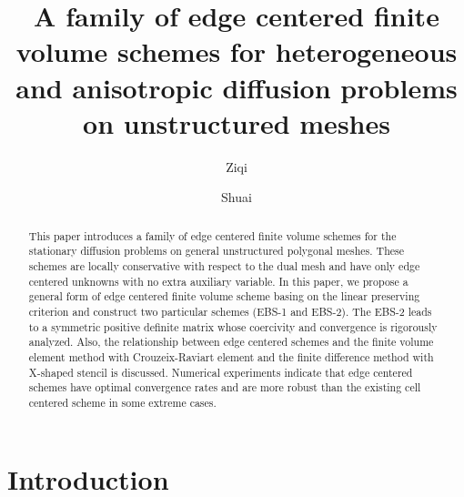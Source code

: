 \documentclass[times,review,preprint,authoryear]{elsarticle}
\begin{document}

\begin{frontmatter}

\title{A family of edge centered finite volume schemes for heterogeneous and anisotropic diffusion problems on unstructured meshes}

\author[1]{Ziqi }

\author[2]{Shuai }

\address[1]{Department of Mathematical Sciences, Tsinghua University, Beijing 100084, PR China}
\address[2]{Graduate School of China Academy of Engineering Physics,  Beijing, 100088, PR China}

\received{***}
\finalform{***}
\accepted{***}
\availableonline{***}
\communicated{***}

\begin{abstract}
This paper introduces a family of edge centered finite volume schemes for the stationary diffusion problems on general unstructured polygonal meshes. These schemes are locally conservative with respect to the dual mesh and have only edge centered unknowns with no extra auxiliary variable.
In this paper, we propose a general form of edge centered finite volume scheme basing on the linear preserving criterion and construct two particular schemes (EBS-1 and EBS-2). The EBS-2 leads to a symmetric positive definite matrix whose coercivity and convergence is rigorously analyzed.
Also, the relationship between edge centered schemes and the finite volume element method with Crouzeix-Raviart element and the finite difference method with X-shaped stencil is discussed.
Numerical experiments indicate that edge centered schemes have optimal convergence rates and are more robust than the existing cell centered scheme in some extreme cases.
\end{abstract}


\end{frontmatter}

\section{Introduction}\label{sec1}
\end{document}
